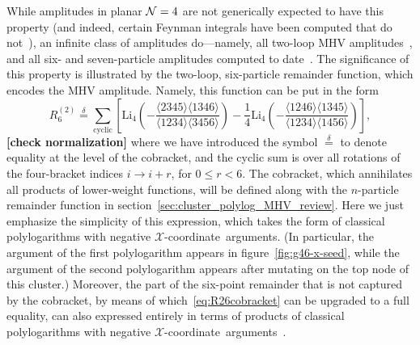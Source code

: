 \documentclass[11pt]{article}
\def\xcoord{$\mathcal{X}$-coordinate}
\def\draftnote#1{{\bf [#1]}}
\begin{document}
While amplitudes in planar ${\cal N}=4$ are not generically expected to have this property (and indeed, certain Feynman integrals have been computed that do not~\cite{Bourjaily:2018aeq,Henn:2018cdp}), an infinite class of amplitudes do---namely, all two-loop MHV amplitudes~\cite{CaronHuot:2011ky}, and all six- and seven-particle amplitudes computed to date~\cite{CaronHuot:2011kk,Dixon:2014iba,Drummond:2014ffa,Dixon:2015iva,Caron-Huot:2016owq,Dixon:2016nkn}. The significance of this property is illustrated by the two-loop, six-particle remainder function, which encodes the MHV amplitude. Namely, this function can be put in the form
\begin{equation} \label{eq:R26cobracket}
	R^{(2)}_6 \stackrel{\delta}{=} \sum_{\text{cyclic}} \left[ \text{Li}_4\left(-\frac{\langle 2345 \rangle \langle 1346 \rangle}{\langle 1234 \rangle \langle 3456 \rangle}\right) - \frac{1}{4} \text{Li}_4 \left(-\frac{\langle 1246 \rangle \langle 1345 \rangle}{\langle 1234 \rangle \langle 1456 \rangle}\right) \right],
\end{equation}
\draftnote{check normalization} where we have introduced the symbol $\stackrel{\delta}{=}$ to denote equality at the level of the cobracket, and the cyclic sum is over all rotations of the four-bracket indices $i \rightarrow i+r$, for $0\leq r <6$. The cobracket, which annihilates all products of lower-weight functions, will be defined along with the $n$-particle remainder function in section~\ref{sec:cluster_polylog_MHV_review}. Here we just emphasize the simplicity of this expression, which takes the form of classical polylogarithms with negative \xcoord\ arguments. (In particular, the argument of the first polylogarithm appears in figure~\ref{fig:g46-x-seed}, while the argument of the second polylogarithm appears after mutating on the top node of this cluster.) Moreover, the part of the six-point remainder that is not captured by the cobracket, by means of which~\eqref{eq:R26cobracket} can be upgraded to a full equality, can also expressed entirely in terms of products of classical polylogarithms with negative \xcoord\ arguments~\cite{Golden:2014xqf}. 
\end{document}
